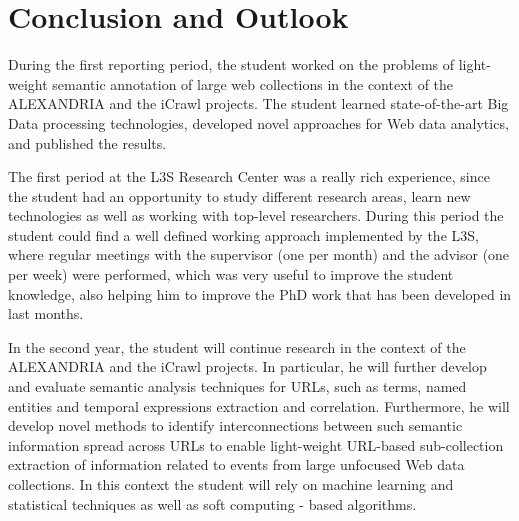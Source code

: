 \documentclass[a4paper,11pt]{report}
\begin{document}
\chapter {Conclusion and Outlook}

During the first reporting period, the student worked on the problems 
of light-weight semantic annotation of large web collections in the 
context of the ALEXANDRIA and the iCrawl projects. The student learned 
state-of-the-art Big Data processing technologies,
developed novel approaches for Web data analytics, and published the results.

The first period at the L3S Research Center was a really rich experience, since the student had
an opportunity to study different research areas, learn new technologies as
well as working with top-level researchers.
%
During this period the student could find a well defined working approach
implemented by the L3S, where regular meetings with the supervisor (one per month)
and the advisor (one per week) were performed, which was very useful to
improve the student knowledge, also helping him to improve the PhD work that has
been developed in last months. 
%

In the second year, the student will continue research in the context of the ALEXANDRIA 
and the iCrawl projects. In particular, he will further develop and evaluate semantic analysis 
techniques for URLs, such as terms, named entities and 
temporal expressions extraction and correlation. Furthermore, he will develop novel methods to identify
interconnections between such semantic information spread across URLs
to enable light-weight URL-based sub-collection extraction of information related to events
from large unfocused Web data collections.
In this context the student will rely on machine learning and 
statistical techniques as well as soft computing - based algorithms. 

\onehalfspace
{}

\end{document}
